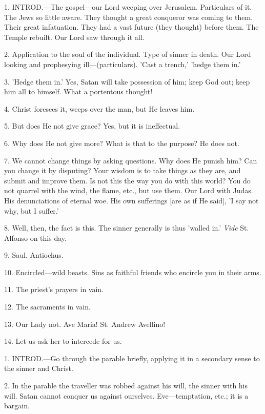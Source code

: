 
1. INTROD.—The
gospel—our Lord weeping over Jerusalem. Particulars of it. The Jews
so little aware. They thought a great conqueror was coming to
them. Their great infatuation. They had a vast future (they thought)
before them. The Temple rebuilt. Our Lord saw through it all.

2. Application to the soul of the individual.
Type of sinner in death. Our Lord looking and prophesying
ill—(particulars). 'Cast a trench,' 'hedge them in.'

3. 'Hedge them in.' Yes, Satan will take
possession of him; keep God out; keep him all to himself. What a
portentous thought!

4. Christ foresees it, weeps over the man, but He
leaves him.

5. But does He not give grace? Yes, but it is
ineffectual.

6. Why does He not give more? What is that to the
purpose? He does not.

7. We cannot change things by asking questions.
Why does He punish him? Can you change it by disputing? Your wisdom is
to take things as they are, and submit and improve them. Is not this
the way you do with this world? You do not quarrel with the wind, the
flame, etc., but use them. Our Lord with Judas. His denunciations of
eternal woe. His own sufferings [are as if He said], 'I say not why,
but I suffer.'

8. Well, then, the fact is this. The sinner
generally is thus 'walled in.' \emph{Vide} St. Alfonso on this day.

9. Saul. Antiochus.

10. Encircled—wild beasts. Sins as faithful
friends who encircle you in their arms.

11. The priest's prayers in vain.

12. The sacraments in vain.

13. Our Lady not. Ave Maria! St. Andrew Avellino!

14. Let us ask her to intercede for us.


1. INTROD.—Go
through the parable briefly, applying it in a secondary sense to the
sinner and Christ.

2. In the parable the traveller was robbed
against his will, the sinner with his will. Satan cannot conquer us
against ourselves. Eve—temptation, etc.; it is a bargain.

